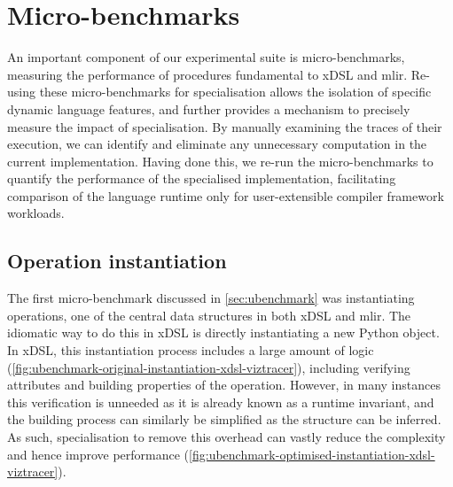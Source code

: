 \section{Micro-benchmarks}
\label{sec:specialising-ubenchmarks}

An important component of our experimental suite is micro-benchmarks, measuring the performance of procedures fundamental to xDSL and \ac{mlir}.
Re-using these micro-benchmarks for specialisation allows the isolation of specific dynamic language features, and further provides a mechanism to precisely measure the impact of specialisation. %
By manually examining the traces of their execution, we can identify and eliminate any unnecessary computation in the current implementation.
Having done this, we re-run the micro-benchmarks to quantify the performance of the specialised implementation, facilitating comparison of the language runtime only for user-extensible compiler framework workloads.


\subsection{Operation instantiation}
\label{ssec:specialising-ubenchmarks-instantiation}

The first micro-benchmark discussed in \autoref{sec:ubenchmark} was instantiating operations, one of the central data structures in both xDSL and \ac{mlir}.
The idiomatic way to do this in xDSL is directly instantiating a new Python object.
In xDSL, this instantiation process includes a large amount of logic (\autoref{fig:ubenchmark-original-instantiation-xdsl-viztracer}), including verifying attributes and building properties of the operation.
However, in many instances this verification is unneeded as it is already known as a runtime invariant, and the building process can similarly be simplified as the structure can be inferred.
As such, specialisation to remove this overhead can vastly reduce the complexity and hence improve performance (\autoref{fig:ubenchmark-optimised-instantiation-xdsl-viztracer}).

